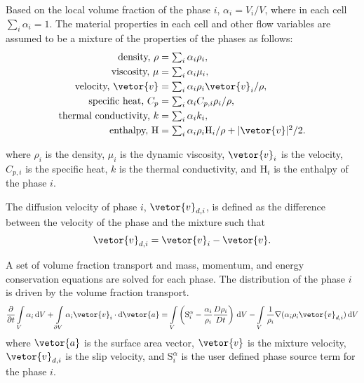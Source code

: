 Based on the local volume fraction of the phase $i$, $\alpha_{i} = V_{i}/V$, where in each cell $\textstyle\sum\nolimits_{i} \alpha_{i} = 1$.
The material properties in each cell and other flow variables are assumed to be a mixture of the properties of the phases as follows:
\begin{subequations}\label{eq_vof_defs}
\begin{align}
\text{density, } \rho &= \textstyle\sum\nolimits_{i} \alpha_{i} \rho_{i},\\
\text{viscosity, } \mu &= \textstyle\sum\nolimits_{i} \alpha_{i} \mu_{i},\\
\text{velocity, } \vetor{v} &= \textstyle\sum\nolimits_{i} \alpha_{i} \rho_{i} \vetor{v}_{i}/ \rho,\\
\text{specific heat, } C_{p} &= \textstyle\sum\nolimits_{i} \alpha_{i} C_{p,i} \rho_{i}/\rho,\\
\text{thermal conductivity, } k &= \textstyle\sum\nolimits_{i} \alpha_{i} k_{i},\\
\text{enthalpy, } \mathrm{H} &= \textstyle\sum\nolimits_{i} \alpha_{i} \rho_{i} \mathrm{H}_{i}/\rho + |\vetor{v}|^{2}/2.
\end{align}
\end{subequations}

\noindent where $\rho_{i}$ is the density, $\mu_{i}$ is the dynamic viscosity,
$\vetor{v}_{i}$ is the velocity, $C_{p,i}$ is the specific heat, $k$ is the thermal conductivity, and $\mathrm{H}_{i}$ is the enthalpy of the phase $i$.

The diffusion velocity of phase $i$, $\vetor{v}_{d,i}$, is defined as the difference between the velocity of the phase and the mixture
such that \[\vetor{v}_{d,i} = \vetor{v}_{i} - \vetor{v}.\]

A set of volume fraction transport and mass, momentum, and energy conservation equations are solved for each phase.
The distribution of the phase $i$ is driven by the volume fraction transport.
\begin{equation}\label{eq_vof_transport}
\frac{\partial}{\partial t}\int\limits_{V} \alpha_{i}\,\mathrm{d}V +
\int\limits_{\partial V} \alpha_{i} \vetor{v}_{i} \cdot \mathrm{d}\vetor{a}
= \int\limits_{V}\left(\mathrm{S}^{\alpha}_{i} - \frac{\alpha_{i}}{\rho_{i}} \frac{D \rho_{i}}{D t}\right)\,\mathrm{d}V
- \int\limits_{V} \frac{1}{\rho_{i}}\nabla (\alpha_{i}\rho_{i}\vetor{v}_{d,i})\,\mathrm{d}V
\end{equation}
\noindent where $\vetor{a}$ is the surface area vector, $\vetor{v}$ is the mixture velocity, $\vetor{v}_{d,i}$ is the slip velocity, and
$\mathrm{S}^{\alpha}_{i}$ is the user defined phase source term for the phase $i$.


